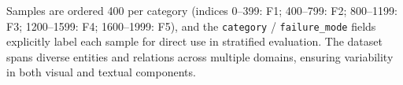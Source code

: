 \documentclass{article}
\begin{document}
Samples are ordered 400 per category (indices 0--399: F1; 400--799: F2; 800--1199: F3; 1200--1599: F4; 1600--1999: F5), and the \texttt{category} / \texttt{failure\_mode} fields explicitly label each sample for direct use in stratified evaluation. The dataset spans diverse entities and relations across multiple domains, ensuring variability in both visual and textual components.






\end{document}

